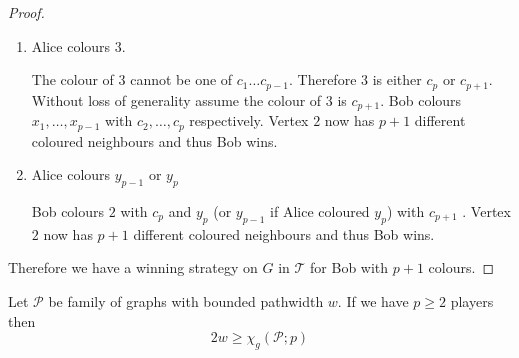 \begin{proof}
\begin{enumerate}
        \item Alice colours $3$.
               
        The colour of $3$ cannot be one of $c_1 \ldots c_{p-1}$. Therefore $3$ is either $c_p$ or $c_{p+1}$. 
        Without loss of generality assume the colour of $3$ is $c_{p+1}$.
        Bob colours $x_1, \dots ,x_{p-1}$ with $c_2,\dots,c_{p}$ respectively.
        Vertex $2$ now has $p+1$ different coloured neighbours and thus Bob wins.  
                       
        \item Alice colours $y_{p-1}$ or $y_{p}$
        
        Bob colours $2$ with $c_p$ and $y_{p}$ (or $y_{p-1}$ if Alice coloured $y_p$) with $c_{p+1}$ .
        Vertex $2$ now has $p+1$ different coloured neighbours and thus Bob wins. 
    \end{enumerate}

    Therefore we have a winning strategy on $G$ in $\mathcal{T}$ for Bob with $p+1$ colours. 
\end{proof}

\begin{theorem}
    Let $\mathcal{P}$ be family of graphs with bounded pathwidth $w$. If we have $p\geq2$ players then \[2w\geq\chi_g(\mathcal{P};p)\]
\end{theorem}


